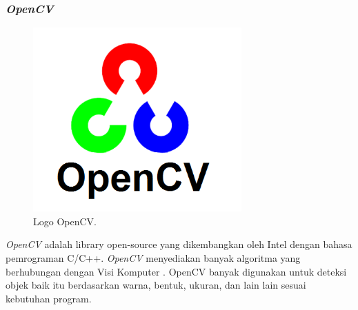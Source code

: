 \subsubsection{\emph{OpenCV}}
\label{sec:opencv}
\begin{figure}[ht]
    \centering
  
    \includegraphics[width=8cm]{gambar/opencv.png}
  
    \caption{Logo OpenCV.}
    \label{fig:opencv}
\end{figure}
\emph{OpenCV} adalah library open-source yang dikembangkan oleh 
Intel dengan bahasa pemrograman C/C++. 
\emph{OpenCV} menyediakan banyak algoritma yang berhubungan dengan Visi 
Komputer \citet{ref_opencv}. OpenCV banyak digunakan untuk deteksi 
objek baik itu berdasarkan warna, bentuk, ukuran, dan lain lain 
sesuai kebutuhan program. 

